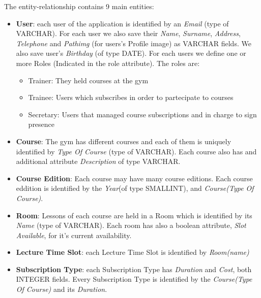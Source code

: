     The entity-relationship contains 9 main entities:
    \begin{itemize}
        \item 
        \textbf{User}: each user of the application is identified by an \textit{Email} (type of VARCHAR). 
    	For each user we also save their \textit{Name}, \textit{Surname}, \textit{Address}, \textit{Telephone} and \textit{Path\textunderscore img} (for users's Profile image) as VARCHAR fields. We also save user's \textit{Birthday} (of type DATE). For each users we define
        one or more Roles (Indicated in the role attribute). The roles are:
        \begin{itemize}
	    \item Trainer: They held courses at the gym 
    	\item Trainee: Users which subscribes in order to partecipate to courses
        \item Secretary: Users that managed course subscriptions and in charge to sign presence
        
        \end{itemize}
    	
    	\item 
    	\textbf{Course}: The gym has different courses and each of them is uniquely identified by 
    	\textit{Type Of Course} (type of VARCHAR). Each course also has and additional attribute \textit{Description} of type VARCHAR.
    	
    	\item 
    	\textbf{Course Edition}: Each course may have many course editions. Each course eddition is identified by the \textit{Year}(of type SMALLINT), and \textit{Course(Type Of Course)}.
    	
    	\item 
    	\textbf{Room}: Lessons of each course are held in a Room which is identified by its \textit{Name} (type of VARCHAR). Each room has also a boolean attribute, \textit{Slot Available}, for it's current availability.
    	
    	\item \textbf{Lecture Time Slot}: each Lecture Time Slot is identified by \textit{Room(name)}
    	
    	\item \textbf{Subscription Type}: each Subscription Type has \textit{Duration} and \textit{Cost}, both INTEGER fields. Every Subscription Type is identified by the \textit{Course(Type Of Course)} and its \textit{Duration}.
    	

\end{itemize}
